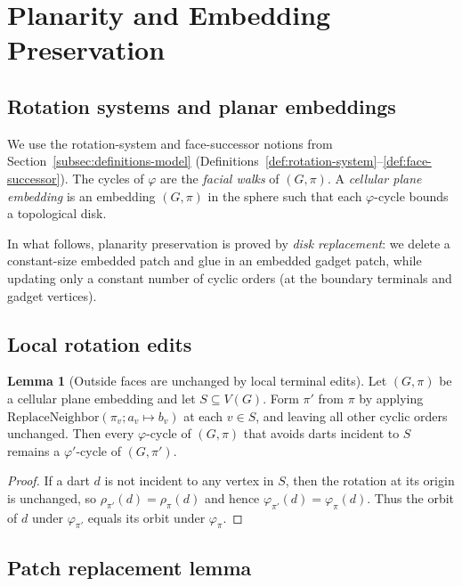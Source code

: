 \documentclass[12pt]{article}
\theoremstyle{definition}
\newtheorem{lemma}[theorem]{Lemma}
\begin{document}
\section{Planarity and Embedding Preservation}
\label{sec:planarity}

\subsection{Rotation systems and planar embeddings}
\label{subsec:rotations}

We use the rotation-system and face-successor notions from Section~\ref{subsec:definitions-model} (Definitions~\ref{def:rotation-system}--\ref{def:face-successor}).
The cycles of $\varphi$ are the \emph{facial walks} of $(G,\pi)$.
A \emph{cellular plane embedding} is an embedding $(G,\pi)$ in the sphere such that each $\varphi$-cycle bounds a topological disk.

In what follows, planarity preservation is proved by \emph{disk replacement}:
we delete a constant-size embedded patch and glue in an embedded gadget patch, while updating only
a constant number of cyclic orders (at the boundary terminals and gadget vertices).

\subsection{Local rotation edits}
\label{subsec:rotation-edits}

\begin{lemma}[Outside faces are unchanged by local terminal edits]
\label{lem:outside-faces-unchanged}
Let $(G,\pi)$ be a cellular plane embedding and let $S\subseteq V(G)$.
Form $\pi'$ from $\pi$ by applying $\mathrm{ReplaceNeighbor}(\pi_v;a_v\mapsto b_v)$ at each $v\in S$,
and leaving all other cyclic orders unchanged.
Then every $\varphi$-cycle of $(G,\pi)$ that avoids darts incident to $S$ remains a $\varphi'$-cycle of $(G,\pi')$.
\end{lemma}
\begin{proof}
If a dart $d$ is not incident to any vertex in $S$, then the rotation at its origin is unchanged, so $\rho_{\pi'}(d)=\rho_{\pi}(d)$ and hence $\varphi_{\pi'}(d)=\varphi_{\pi}(d)$.
Thus the orbit of $d$ under $\varphi_{\pi'}$ equals its orbit under $\varphi_{\pi}$.
\end{proof}

\subsection{Patch replacement lemma}
\label{subsec:patch-replacement}
\end{document}
